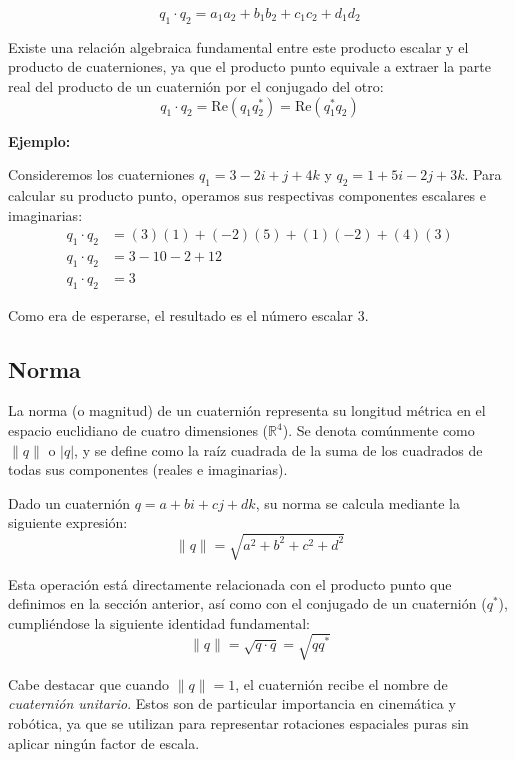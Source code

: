 \begin{equation}
    q_1 \cdot q_2 = a_1a_2 + b_1b_2 + c_1c_2 + d_1d_2
\end{equation}

Existe una relación algebraica fundamental entre este producto escalar y el producto de cuaterniones, ya que el producto punto equivale a extraer la parte real del producto de un cuaternión por el conjugado del otro:
\begin{equation}
    q_1 \cdot q_2 = \text{Re}(q_1 q_2^*) = \text{Re}(q_1^* q_2)
\end{equation}

\textbf{Ejemplo:}

Consideremos los cuaterniones $q_1 = 3 - 2i + j + 4k$ y $q_2 = 1 + 5i - 2j + 3k$. Para calcular su producto punto, operamos sus respectivas componentes escalares e imaginarias:
\begin{align*}
    q_1 \cdot q_2 &= (3)(1) + (-2)(5) + (1)(-2) + (4)(3) \\
    q_1 \cdot q_2 &= 3 - 10 - 2 + 12 \\
    q_1 \cdot q_2 &= 3
\end{align*}

Como era de esperarse, el resultado es el número escalar $3$.

\subsection{Norma}
La norma (o magnitud) de un cuaternión representa su longitud métrica en el espacio euclidiano de cuatro dimensiones ($\mathbb{R}^4$). Se denota comúnmente como $\lVert q \rVert$ o $|q|$, y se define como la raíz cuadrada de la suma de los cuadrados de todas sus componentes (reales e imaginarias).

Dado un cuaternión $q = a + bi + cj + dk$, su norma se calcula mediante la siguiente expresión:
\begin{equation}
    \lVert q \rVert = \sqrt{a^2 + b^2 + c^2 + d^2}
\end{equation}

Esta operación está directamente relacionada con el producto punto que definimos en la sección anterior, así como con el conjugado de un cuaternión ($q^*$), cumpliéndose la siguiente identidad fundamental:
\begin{equation}
    \lVert q \rVert = \sqrt{q \cdot q} = \sqrt{q q^*}
\end{equation}

Cabe destacar que cuando $\lVert q \rVert = 1$, el cuaternión recibe el nombre de \textit{cuaternión unitario}. Estos son de particular importancia en cinemática y robótica, ya que se utilizan para representar rotaciones espaciales puras sin aplicar ningún factor de escala.

